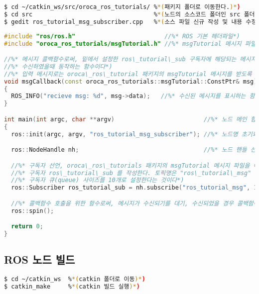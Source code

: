 \begin{lstlisting}[language=bash]
$ cd ~/catkin_ws/src/oroca_ros_tutorials/ %*(패키지 폴더로 이동한다.)*)
$ cd src                                  %*(노드의 소스코드 폴더인 src 폴더로 이동)*)
$ gedit ros_tutorial_msg_subscriber.cpp   %*(소스 파일 신규 작성 및 내용 수정)*)
\end{lstlisting}

\begin{lstlisting}[language=C++]
#include "ros/ros.h"                         //%* ROS 기본 헤더파일*) 
#include "oroca_ros_tutorials/msgTutorial.h" //%* msgTutorial 메시지 파일 헤더*)

//%* 메시지 콜백함수로써, 밑에서 설정한 ros\_tutorial\_sub 구독자에 해당되는 메시지를*)
//%* 수신하였을때 동작하는 함수이다*)
//%* 입력 메시지로는 oroca\_ros\_tutorial 패키지의 msgTutorial 메시지를 받도록 되어있다 *)
void msgCallback(const oroca_ros_tutorials::msgTutorial::ConstPtr& msg)
{
  ROS_INFO("recieve msg: %d", msg->data);   //%* 수신된 메시지를 표시하는 함수*)
}

int main(int argc, char **argv)                         //%* 노드 메인 함수*)
{
  ros::init(argc, argv, "ros_tutorial_msg_subscriber"); //%* 노드명 초기화*)

  ros::NodeHandle nh;                                   //%* 노드 핸들 선언*)

  //%* 구독자 선언, oroca\_ros\_tutorials 패키지의 msgTutorial 메시지 파일을 이용한*)
  //%* 구독자 ros\_tutorial\_sub 를 작성한다. 토픽명은 "ros\_tutorial\_msg" 이며,*)
  //%* 구독자 큐(queue) 사이즈를 10개로 설정한다는 것이다*)
  ros::Subscriber ros_tutorial_sub = nh.subscribe("ros_tutorial_msg", 10, msgCallback);

  //%* 콜백함수 호출을 위한 함수로써, 메시지가 수신되기를 대기, 수신되었을 경우 콜백함수를 실행한다*)
  ros::spin();

  return 0;
}
\end{lstlisting}

\subsection{ROS 노드 빌드}

\begin{lstlisting}[language=bash]
$ cd ~/catkin_ws  %*(catkin 폴더로 이동)*)
$ catkin_make     %*(catkin 빌드 실행)*)
\end{lstlisting}

